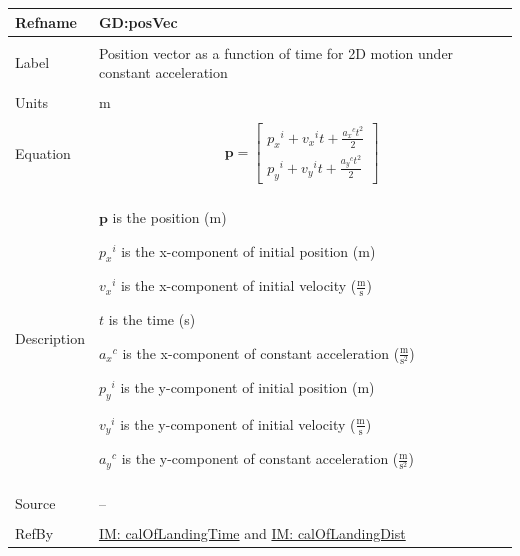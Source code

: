 \documentclass[12pt]{article}
\begin{document}
\noindent \begin{minipage}{\textwidth}
\begin{tabular}{p{} p{}}
\toprule \textbf{Refname} & \textbf{GD:posVec}
\label{GD:posVec}
\\ \midrule \\
Label & Position vector as a function of time for 2D motion under constant acceleration
\\ \midrule \\
Units & m
\\ \midrule \\
Equation & \begin{displaymath}
           \mathbf{p}=\begin{bmatrix}
{{p_{x}}^{i}}+{{v_{x}}^{i}} t+\frac{{{a_{x}}^{c}} t^{2}}{2}\\
{{p_{y}}^{i}}+{{v_{y}}^{i}} t+\frac{{{a_{y}}^{c}} t^{2}}{2}
\end{bmatrix}
           \end{displaymath}
\\ \midrule \\
Description & \begin{symbDescription}
              \item{$\mathbf{p}$ is the position (m)}
              \item{${{p_{x}}^{i}}$ is the x-component of initial position (m)}
              \item{${{v_{x}}^{i}}$ is the x-component of initial velocity ($\frac{\text{m}}{\text{s}}$)}
              \item{$t$ is the time (s)}
              \item{${{a_{x}}^{c}}$ is the x-component of constant acceleration ($\frac{\text{m}}{\text{s}^{2}}$)}
              \item{${{p_{y}}^{i}}$ is the y-component of initial position (m)}
              \item{${{v_{y}}^{i}}$ is the y-component of initial velocity ($\frac{\text{m}}{\text{s}}$)}
              \item{${{a_{y}}^{c}}$ is the y-component of constant acceleration ($\frac{\text{m}}{\text{s}^{2}}$)}
              \end{symbDescription}
\\ \midrule \\
Source & --
\\ \midrule \\
RefBy & \hyperref[IM:calOfLandingTime]{IM: calOfLandingTime} and \hyperref[IM:calOfLandingDist]{IM: calOfLandingDist}
\\ \bottomrule \end{tabular}
\end{minipage}
\end{document}
